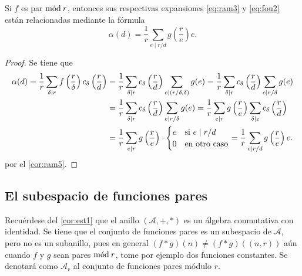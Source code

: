 \begin{theorem}
Si $f$ es par $\mathrm{m\acute{o}d\:}r$, entonces sus respectivas expansiones \eqref{eq:ram3} y \eqref{eq:fou2} están relacionadas mediante la fórmula
\begin{equation*}
    \alpha(d) = \frac{1}{r} \sum_{e \mid r/d} g \left( \frac{r}{e} \right) e.
\end{equation*}
\end{theorem}
\begin{proof}
Se tiene que
\begin{align*}
    \alpha(d) = \frac{1}{r} \sum_{\delta \mid r} f \left( \frac{r}{\delta} \right) c_{\delta} \left( \frac{r}{d} \right) & = \frac{1}{r} \sum_{\delta \mid r} c_{\delta} \left( \frac{r}{d} \right) \sum_{e \mid (r/\delta,\delta)} g(e) = \frac{1}{r} \sum_{\delta \mid r} c_{\delta} \left( \frac{r}{d} \right) \sum_{e \mid r/\delta} g(e) \\
              & = \frac{1}{r} \sum_{\delta \mid r} c_{\delta} \left( \frac{r}{d} \right) \sum_{e \mid r/\delta} g(e) = \frac{1}{r} \sum_{e \mid r} g \left( \frac{r}{e} \right) \sum_{\delta \mid e} c_{\delta} \left( \frac{r}{d} \right) \\
              & = \frac{1}{r} \sum_{e \mid r} g \left( \frac{r}{e} \right) \cdot \begin{cases}
                  \hfil e & \text{si } e \mid r/d \\
                  \hfil 0 & \text{en otro caso} \\
              \end{cases} = \frac{1}{r} \sum_{e \mid r/d} g \left( \frac{r}{e} \right) e.
\end{align*}
por el \cref{cor:ram5}.
\end{proof}

\subsection{El subespacio de funciones pares}

Recuérdese del \cref{cor:est1} que el anillo $(\mathcal{A}, +, *)$ es un álgebra conmutativa con identidad. Se tiene que el conjunto de funciones pares es un subespacio de $\mathcal{A}$, pero no es un subanillo, pues en general $(f*g)(n) \ne (f*g)((n,r))$ aún cuando $f$ y $g$ sean pares $\mathrm{m\acute{o}d\:}r$, tome por ejemplo dos funciones constantes. Se denotará como $\mathcal{A}_r$ al conjunto de funciones pares módulo $r$.

